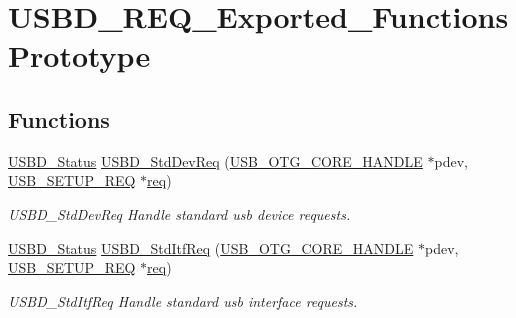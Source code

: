 \hypertarget{group___u_s_b_d___r_e_q___exported___functions_prototype}{\section{U\-S\-B\-D\-\_\-\-R\-E\-Q\-\_\-\-Exported\-\_\-\-Functions\-Prototype}
\label{group___u_s_b_d___r_e_q___exported___functions_prototype}
}
\subsection*{Functions}
\begin{DoxyCompactItemize}
\item 
\hyperlink{group___u_s_b_d___c_o_r_e___exported___defines_ga1c59ec10075b576176aa51c9ef4e9fc4}{U\-S\-B\-D\-\_\-\-Status} \hyperlink{group___u_s_b_d___r_e_q___exported___functions_prototype_ga8ffadad0364221ad24569053d0579bf8}{U\-S\-B\-D\-\_\-\-Std\-Dev\-Req} (\hyperlink{group___u_s_b___c_o_r_e___exported___types_gaf76054c11eb8a3367907aad7ae700e80}{U\-S\-B\-\_\-\-O\-T\-G\-\_\-\-C\-O\-R\-E\-\_\-\-H\-A\-N\-D\-L\-E} $\ast$pdev, \hyperlink{group___u_s_b___c_o_r_e___exported___types_gacd8d898c844c3657315c7d7a4ea3a99c}{U\-S\-B\-\_\-\-S\-E\-T\-U\-P\-\_\-\-R\-E\-Q} $\ast$\hyperlink{pios__opahrs__proto_8h_ad651fd9affe5ed0ac9abccd8e2791a2c}{req})
\begin{DoxyCompactList}\small\item\em U\-S\-B\-D\-\_\-\-Std\-Dev\-Req Handle standard usb device requests. \end{DoxyCompactList}\item 
\hyperlink{group___u_s_b_d___c_o_r_e___exported___defines_ga1c59ec10075b576176aa51c9ef4e9fc4}{U\-S\-B\-D\-\_\-\-Status} \hyperlink{group___u_s_b_d___r_e_q___exported___functions_prototype_ga6092576a8408c8e638ead7fcb30b0dd1}{U\-S\-B\-D\-\_\-\-Std\-Itf\-Req} (\hyperlink{group___u_s_b___c_o_r_e___exported___types_gaf76054c11eb8a3367907aad7ae700e80}{U\-S\-B\-\_\-\-O\-T\-G\-\_\-\-C\-O\-R\-E\-\_\-\-H\-A\-N\-D\-L\-E} $\ast$pdev, \hyperlink{group___u_s_b___c_o_r_e___exported___types_gacd8d898c844c3657315c7d7a4ea3a99c}{U\-S\-B\-\_\-\-S\-E\-T\-U\-P\-\_\-\-R\-E\-Q} $\ast$\hyperlink{pios__opahrs__proto_8h_ad651fd9affe5ed0ac9abccd8e2791a2c}{req})
\begin{DoxyCompactList}\small\item\em U\-S\-B\-D\-\_\-\-Std\-Itf\-Req Handle standard usb interface requests. \end{DoxyCompactList}\item 

\end{DoxyCompactItemize}
